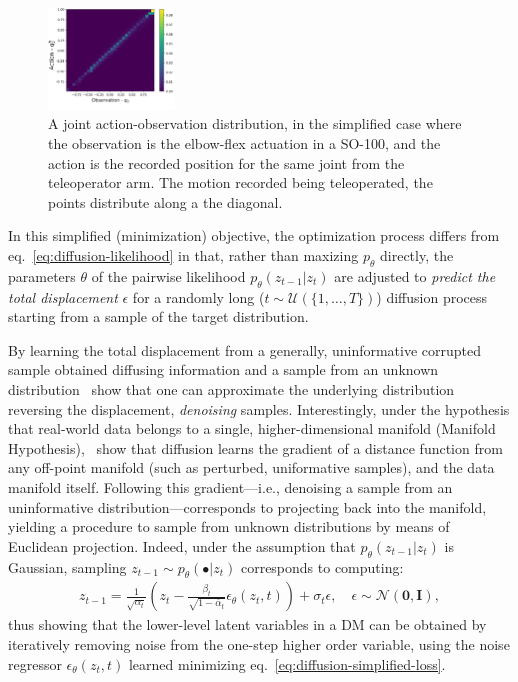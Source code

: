 \begin{figure}
    \centering
    \includegraphics[width=0.3\textwidth]{figures/ch4/ch4-action-vs-observation-distribution.png}
    \caption{A joint action-observation distribution, in the simplified case where the observation is the elbow-flex actuation in a SO-100, and the action is the recorded position for the same joint from the teleoperator arm. The motion recorded being teleoperated, the points distribute along a the diagonal.}
    \label{fig:ch4-action-vs-observation-distribution}
\end{figure}

In this simplified (minimization) objective, the optimization process differs from eq.~\ref{eq:diffusion-likelihood} in that, rather than maxizing \( p_\theta \) directly, the parameters \( \theta \) of the pairwise likelihood \( p_\theta(z_{t-1} \vert z_t) \) are adjusted to \emph{predict the total displacement} \( \epsilon \) for a randomly long (\( t \sim \mathcal{U}(\{1,\dots,T\}) \)) diffusion process starting from a sample of the target distribution.

By learning the total displacement from a generally, uninformative corrupted sample obtained diffusing information and a sample from an unknown distribution~\citet{hoDenoisingDiffusionProbabilistic2020} show that one can approximate the underlying distribution reversing the displacement, \emph{denoising} samples.
Interestingly, under the hypothesis that real-world data belongs to a single, higher-dimensional manifold (Manifold Hypothesis),~\citet{permenterInterpretingImprovingDiffusion2024} show that diffusion learns the gradient of a distance function from any off-point manifold (such as perturbed, uniformative samples), and the data manifold itself.
Following this gradient---i.e., denoising a sample from an uninformative distribution---corresponds to projecting back into the manifold, yielding a procedure to sample from unknown distributions by means of Euclidean projection.
Indeed, under the assumption that \(p_\theta (z_{t-1} \vert z_t) \) is Gaussian, sampling \(z_{t-1} \sim p_\theta(\bullet \vert z_{t}) \) corresponds to computing:
\begin{align}
    z_{t-1} = \frac{1}{\sqrt{\alpha_t}} \left( z_t - \frac{\beta_t}{\sqrt{1 - \bar\alpha_t}} \epsilon_\theta(z_t, t) \right) + \sigma_t \epsilon, \quad \epsilon \sim \mathcal N(\mathbf{0}, \mathbf{I}), \label{eq:diffusion-denoising-definition}
\end{align}
thus showing that the lower-level latent variables in a DM can be obtained by iteratively removing noise from the one-step higher order variable, using the noise regressor \( \epsilon_\theta(z_t, t)\) learned minimizing eq.~\ref{eq:diffusion-simplified-loss}.

